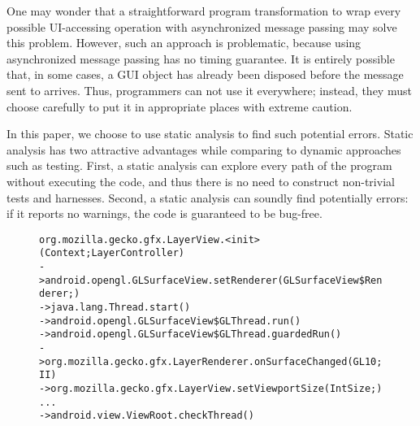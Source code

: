 One may wonder that a straightforward program transformation to wrap
every possible UI-accessing operation with asynchronized message passing
may solve this problem. However, such an approach is problematic,
because using asynchronized message passing has no timing
guarantee. It is entirely possible that, in some cases, a GUI object has already been
disposed before the message sent to arrives. Thus, programmers can not use
it everywhere; instead, they must choose carefully to put it in appropriate places
with extreme caution.


In this paper, we choose to use static analysis to find such potential errors.
Static analysis has two attractive advantages while comparing to dynamic approaches such as
 testing.
First, a static analysis can explore every path of the program without executing the code, and
thus there is no need to construct non-trivial tests and harnesses.
Second, a static analysis can soundly find potentially errors: if it
reports no warnings, the code is guaranteed to be bug-free. 


\begin{figure}[t]
\begin{CodeOut}
\begin{alltt}

   org.mozilla.gecko.gfx.LayerView.<init>(Context;LayerController)
-> android.opengl.GLSurfaceView.setRenderer(GLSurfaceView\$Renderer;)
-> java.lang.Thread.start()
-> android.opengl.GLSurfaceView\$GLThread.run()
-> android.opengl.GLSurfaceView\$GLThread.guardedRun()
-> org.mozilla.gecko.gfx.LayerRenderer.onSurfaceChanged(GL10;II)
-> org.mozilla.gecko.gfx.LayerView.setViewportSize(IntSize;)
...
-> android.view.ViewRoot.checkThread()
\end{alltt}
\end{CodeOut}
\vspace*{-2.0ex}  %
\end{figure}

